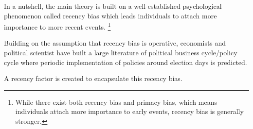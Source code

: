 \documentclass[hyphens, crop=false]{standalone}
\begin{document}
	
	In a nutshell,
	the main theory is built on a well-established
	psychological phenomenon called recency bias
	which leads individuals to attach more importance to more recent events.%
	\footnote{While there exist both recency bias and primacy bias, which means individuals attach more importance to early events, recency bias is generally stronger.}
		
	Building on the assumption that recency bias is operative,
	economists and political scientist have built a large literature of political business cycle/policy cycle
	where periodic implementation of policies around election days is predicted.

	A recency factor is created to encapsulate this recency bias.
	

	
	
	
	
	
	
	
	
	
	
	
	
	
	
	
	
	
	
	
	
	
	

		
	
	
\end{document}

